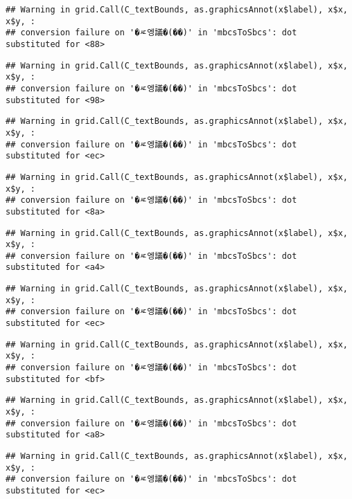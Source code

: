 \documentclass[
]{article}
\begin{document}
\begin{verbatim}
## Warning in grid.Call(C_textBounds, as.graphicsAnnot(x$label), x$x, x$y, :
## conversion failure on '�ㅼ엥議�(��)' in 'mbcsToSbcs': dot substituted for <88>
\end{verbatim}

\begin{verbatim}
## Warning in grid.Call(C_textBounds, as.graphicsAnnot(x$label), x$x, x$y, :
## conversion failure on '�ㅼ엥議�(��)' in 'mbcsToSbcs': dot substituted for <98>
\end{verbatim}

\begin{verbatim}
## Warning in grid.Call(C_textBounds, as.graphicsAnnot(x$label), x$x, x$y, :
## conversion failure on '�ㅼ엥議�(��)' in 'mbcsToSbcs': dot substituted for <ec>
\end{verbatim}

\begin{verbatim}
## Warning in grid.Call(C_textBounds, as.graphicsAnnot(x$label), x$x, x$y, :
## conversion failure on '�ㅼ엥議�(��)' in 'mbcsToSbcs': dot substituted for <8a>
\end{verbatim}

\begin{verbatim}
## Warning in grid.Call(C_textBounds, as.graphicsAnnot(x$label), x$x, x$y, :
## conversion failure on '�ㅼ엥議�(��)' in 'mbcsToSbcs': dot substituted for <a4>
\end{verbatim}

\begin{verbatim}
## Warning in grid.Call(C_textBounds, as.graphicsAnnot(x$label), x$x, x$y, :
## conversion failure on '�ㅼ엥議�(��)' in 'mbcsToSbcs': dot substituted for <ec>
\end{verbatim}

\begin{verbatim}
## Warning in grid.Call(C_textBounds, as.graphicsAnnot(x$label), x$x, x$y, :
## conversion failure on '�ㅼ엥議�(��)' in 'mbcsToSbcs': dot substituted for <bf>
\end{verbatim}

\begin{verbatim}
## Warning in grid.Call(C_textBounds, as.graphicsAnnot(x$label), x$x, x$y, :
## conversion failure on '�ㅼ엥議�(��)' in 'mbcsToSbcs': dot substituted for <a8>
\end{verbatim}

\begin{verbatim}
## Warning in grid.Call(C_textBounds, as.graphicsAnnot(x$label), x$x, x$y, :
## conversion failure on '�ㅼ엥議�(��)' in 'mbcsToSbcs': dot substituted for <ec>
\end{verbatim}
\end{document}
